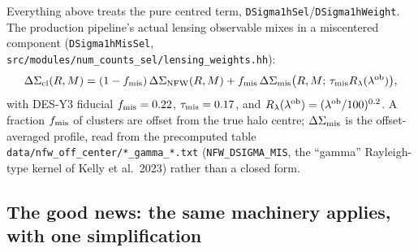 \documentclass[a4paper, 11pt]{article}
\newcommand{\DSnfw}{\Delta\Sigma_{\rm NFW}}
\begin{document}
Everything above treats the pure centred term,
\texttt{DSigma1hSel}/\texttt{DSigma1hWeight}. The production
pipeline's actual lensing observable mixes in a miscentered
component (\texttt{DSigma1hMisSel},
\texttt{src/modules/num\_counts\_sel/lensing\_weights.hh}):
\begin{equation}
\Delta\Sigma_{\rm cl}(R,M) = (1-f_{\rm mis})\,\DSnfw(R,M)
+ f_{\rm mis}\,\Delta\Sigma_{\rm mis}\big(R,M;\,\tau_{\rm mis}R_\lambda(\lambda^{\rm ob})\big),
\label{eq:mixture}
\end{equation}
with DES-Y3 fiducial $f_{\rm mis}=0.22$, $\tau_{\rm mis}=0.17$, and
$R_\lambda(\lambda^{\rm ob})=(\lambda^{\rm ob}/100)^{0.2}$. A
fraction $f_{\rm mis}$ of clusters are offset from the true halo
centre; $\Delta\Sigma_{\rm mis}$ is the offset-averaged profile,
read from the precomputed table
\texttt{data/nfw\_off\_center/*\_gamma\_*.txt}
(\texttt{NFW\_DSIGMA\_MIS}, the ``gamma'' Rayleigh-type kernel of
Kelly et al.\ 2023) rather than a closed form.

\subsection{The good news: the same machinery applies, with one simplification}
\end{document}
